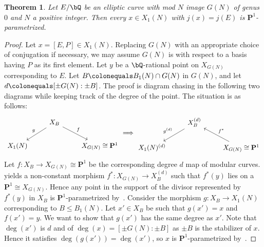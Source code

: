 \documentclass[11pt,reqno]{amsart}
\theoremstyle{plain}
\newtheorem{theorem}{Theorem}%
\theoremstyle{definition}
\newcommand{\Q}{\bQ}
\newcommand{\PP}{\mathbf P}
\newcommand{\isom}{\cong}
\newcommand{\filip}[1]{{\textcolor{cyan}{Filip: [#1]}}}
\newcommand{\abbey}[1]{\textcolor{blue}{Abbey: #1}}
\begin{document}
\begin{theorem} \label{Genus0Prop}
Let $E/\Q$ be an elliptic curve with mod $N$ image $G(N)$ of genus $0$ and $N$ a positive integer. %
Then every $x \in X_1(N)$ with $j(x) = j(E)$ is $\PP^1$-parametrized.
\end{theorem}
\begin{proof}
Let $x=[E,P]\in X_1(N)$. Replacing $G(N)$ with an appropriate choice of conjugation if necessary, we may assume $G(N)$ is with respect to a basis having $P$ as its first element. Let $y$ be a $\Q$-rational point on $X_{G(N)}$ corresponding to $E$. Let $B \colonequals B_1(N) \cap G(N)$ in $G(N)$, and let $d \colonequals [\pm G(N) : \pm B]$. The proof is diagram chasing in the following two diagrams while keeping track of the degree of the point.  The situation is as follows:
\[
\begin{tikzcd}
     &X_B \arrow[rd, "f"] \arrow[dl,"g",swap] &  \\
     X_1(N) & &X_{G(N)} \isom \PP^1
\end{tikzcd}
     \Longrightarrow
\begin{tikzcd}
      &X_B^{(d)} \arrow[dl,"g^{(d)}",swap] & \\
     X_1(N)^{(d)} & &X_{G(N)} \isom \PP^1\arrow[ul, "f^*",swap]
\end{tikzcd}
\]
Let $f\colon X_{B}\rightarrow X_{G(N)} \isom \PP^1$ be the corresponding degree $d$ map of modular curves.
 yields a non-constant morphism $f^*\colon X_{G(N)} \to X_{B}^{(d)}$ such that $f^*(y)$ lies on a $\PP^1 \isom X_{G(N)}$. 
Hence any point in the support of the divisor represented by $f^*(y)$ in $X_B$ is $\PP^1$-parametrized by~. Consider the morphism $g\colon X_B \to X_1(N)$ corresponding to $B \leq B_1(N)$. Let $x'\in X_B$ be such that $g(x')=x$ and $f(x')=y$. We want to show that $g(x')$ has the same degree as $x'$. Note that $\deg(x')$ is $d$ and of $\deg(x)=[\pm G(N): \pm B]$ as $\pm B$ is the stabilizer of $x$. Hence it satisfies $\deg(g(x')) = \deg(x')$, so $x$ is $\PP^1$-parametrized by~.
\end{proof}
\end{document}
